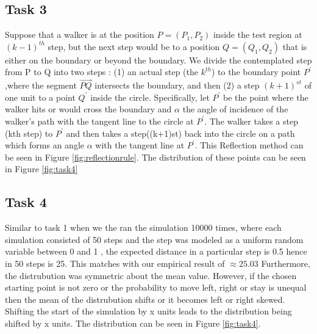 \documentclass[a4paper, 11pt]{book} %
\begin{document}
\subsection*{Task 3}

Suppose that a walker is at the position $P = (P_1,P_2)$ inside the test region at $(k-1)^{th}$ step, but
the next step would be to a position $ Q = (Q_1,Q_2) $ that is either on the boundary or beyond the 
boundary. We divide the contemplated step from P to Q into two steps  : (1) an
actual step (the $k^{th}$) to the boundary point $P^{\prime}$,where the segment $\vec{PQ} $ intersects the boundary,  and then (2)
a step $(k+1)^{st}$ of one unit to a point $Q^{\prime}$ inside the circle. Specifically, let $P^{\prime}$ be the
point where the walker hits or would cross the boundary and $\alpha$ the angle of incidence of the walker's path
with the tangent line to the circle at  $P^{\prime}$. The walker takes a step (kth step) to $P^{\prime}$ and then takes a step((k+1)st) back into the 
circle on a path which forms an angle $\alpha$ with the tangent line at $P^{\prime}$. This Reflection method can be seen in Figure \ref{fig:reflectionrule}.
The distribution of these points can be seen in Figure  \ref{fig:task4}







\subsection*{Task 4}

Similar to task 1 when we the ran the simulation 10000 times, where each simulation consisted of 50 steps and the step was modeled as a uniform random variable between 0 and 1 , the expected distance in a particular step is 0.5 hence in 50 steps is 25. This matches with our empirical result of \(\approx 25.03 \)
Furthermore, the distrubution was symmetric about the mean value. However, if the chosen starting point is not zero or the probability to move left, right or stay is unequal then the mean of the distrubution shifts or it becomes left or right skewed. Shifting the start of the simulation by x units leads to the distribution being shifted by x units. The distribution can be seen in Figure \ref{fig:task4}.


\end{document}
